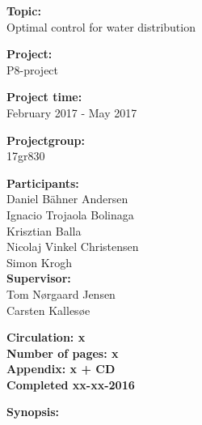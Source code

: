 \begin{minipage}[t]{0.48\textwidth}
\textbf{Topic:} \\[5pt]\bigskip\hspace{2ex}
Optimal control for water distribution

\textbf{Project:} \\[5pt]\bigskip\hspace{2ex}
P8-project

\textbf{Project time:} \\[5pt]\bigskip\hspace{2ex}
February 2017 - May 2017

\textbf{Projectgroup:} \\[5pt]\bigskip\hspace{2ex}
17gr830	

\textbf{Participants:} \\[5pt]\hspace*{2ex}
Daniel Bähner Andersen \\\hspace*{2ex}
Ignacio Trojaola Bolinaga \\\hspace*{2ex} 
Krisztian Balla \\\hspace*{2ex}
Nicolaj Vinkel Christensen \\\hspace*{2ex}
Simon Krogh \\

\textbf{Supervisor:} \\[5pt]\hspace*{2ex}
Tom Nørgaard Jensen \\\hspace*{2ex}
Carsten Kallesøe \\\bigskip\hspace{2ex}

\vspace*{3.5cm}

\textbf{Circulation: x} \\
\textbf{Number of pages: x}\\
\textbf{Appendix: x + CD} \\
\textbf{Completed xx-xx-2016}\\
\end{minipage}
\hfill
\begin{minipage}[t]{0.483\textwidth}
\textbf{Synopsis:} \\[5pt]
\fbox{\parbox{7cm}{\bigskip\bigskip}}
\end{minipage}

\vfill
